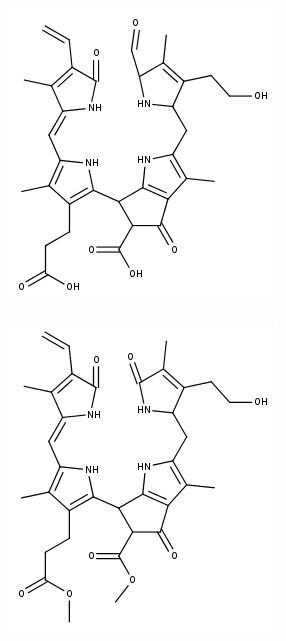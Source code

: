 \begin{figure}[!htbp]
  \begin{subfigure}[b]{0.5\textwidth}
    \includegraphics[width=\textwidth]{figures/Kapitel7/Kataboliten/fragmentation_structures/VWA_Katabolit_631.png}
    \caption{}
    \label{fig:631MHStruktur}
  \end{subfigure}
  \hfill
  \begin{subfigure}[b]{0.5\textwidth}
    \includegraphics[width=\textwidth]{figures/Kapitel7/Kataboliten/fragmentation_structures/VWA_Katabolit_645_nachReaktion.png}

\end{subfigure}
\end{figure}

